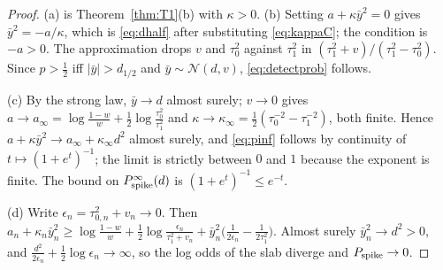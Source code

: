\documentclass[11pt]{article}
\newcommand{\Normal}{\mathcal{N}}
\theoremstyle{definition}
\theoremstyle{plain}
\begin{document}
{\begin{proof}
(a) is Theorem~\ref{thm:T1}(b) with $\kappa>0$. (b) Setting $a+\kappa\bar y^2=0$ gives $\bar y^2=-a/\kappa$, which is \eqref{eq:dhalf} after substituting \eqref{eq:kappaC}; the condition is $-a>0$. The approximation drops $v$ and $\tau_0^2$ against $\tau_1^2$ in $(\tau_1^2+v)/(\tau_1^2-\tau_0^2)$. Since $p>\tfrac12$ iff $|\bar y|>d_{1/2}$ and $\bar y\sim\Normal(d,v)$, \eqref{eq:detectprob} follows.

(c) By the strong law, $\bar y\to d$ almost surely; $v\to0$ gives $a\to a_\infty=\log\frac{1-w}{w}+\frac{1}{2}\log\frac{\tau_0^2}{\tau_1^2}$ and $\kappa\to\kappa_\infty=\frac{1}{2}(\tau_0^{-2}-\tau_1^{-2})$, both finite. Hence $a+\kappa\bar y^2\to a_\infty+\kappa_\infty d^2$ almost surely, and \eqref{eq:pinf} follows by continuity of $t\mapsto(1+e^t)^{-1}$; the limit is strictly between $0$ and $1$ because the exponent is finite. The bound on $P_{\mathrm{spike}}^\infty(d)$ is $(1+e^t)^{-1}\le e^{-t}$.

(d) Write $\epsilon_n=\tau_{0,n}^2+v_n\to0$. Then $a_n+\kappa_n\bar y_n^2\ge\log\frac{1-w}{w}+\frac{1}{2}\log\frac{\epsilon_n}{\tau_1^2+v_n}+\bar y_n^2\bigl(\frac{1}{2\epsilon_n}-\frac{1}{2\tau_1^2}\bigr)$. Almost surely $\bar y_n^2\to d^2>0$, and $\frac{d^2}{2\epsilon_n}+\frac{1}{2}\log\epsilon_n\to\infty$, so the log odds of the slab diverge and $P_{\mathrm{spike}}\to0$.
\end{proof}

}
\end{document}
